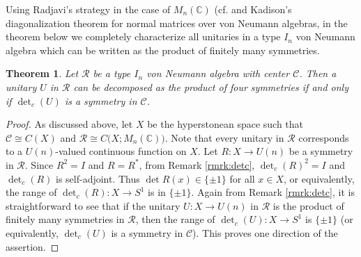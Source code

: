 \documentclass[12pt, preprint]{amsart}
\newtheorem{thm}{Theorem}[section]
\newcommand{\C}{\mathbb{C}}
\theoremstyle{definition}
\theoremstyle{remark}
\numberwithin{equation}{section}
\theoremstyle{ser}
\theoremstyle{serr}
\theoremstyle{ser}
\begin{document}
Using Radjavi's strategy in the case of $M_n(\C)$ (cf. \cite[Theorem 3]{radjavi} and Kadison's diagonalization theorem for normal matrices over von Neumann algebras, in the theorem below we completely characterize all unitaries in a type $I_n$ von Neumann algebra which can be written as the product of finitely many symmetries.


\begin{thm}
\label{thm:mainthm1}
\textsl{
Let $\mathscr{R}$ be a type $I_n$ von Neumann algebra with center $\mathscr{C}$. Then a unitary $U$ in $\mathscr{R}$ can be decomposed as the product of four symmetries if and only if $\det_c(U)$ is a symmetry in $\mathscr{C}$.
}
\end{thm}
\begin{proof}
As discussed above, let $X$ be the hyperstonean space such that $\mathscr{C} \cong C(X)$ and $\mathscr{R} \cong C\big( X; M_n(\C) \big)$. Note that every unitary in $\mathscr{R}$ corresponds to a $U(n)$-valued continuous function on $X$. Let $R : X \to U(n)$ be a symmetry in $\mathscr{R}$. Since $R^2 = I$ and $R = R^*$, from Remark \ref{rmrk:detc}, $\det_c (R)^2 = I$ and $\det_c(R)$ is self-adjoint. Thus $\det R(x) \in \{ \pm 1\}$ for all $x \in X$, or equivalently, the range of $\det_c (R) : X \to S^1$ is in $\{ \pm 1 \}$. Again from Remark \ref{rmrk:detc}, it is straightforward to see that if the unitary $U : X \to U(n)$ in $\mathscr{R}$ is the product of finitely many symmetries in $\mathscr{R}$, then the range of $\det_c(U) : X \to S^1$ is $\{ \pm 1 \}$ (or equivalently, $\det _c (U)$ is a symmetry in $\mathscr{C}$). This proves one direction of the assertion. 


\end{proof}
\end{document}
